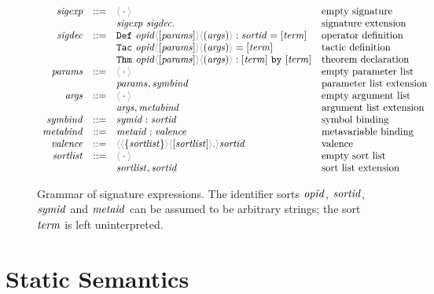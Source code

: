 \begin{figure}[H]
  \begin{displaymath}
    \begin{array}{rcll}
       \SortSigExpr & ::=
         & \ProdEmptySig & \text{empty signature}\\
         && \ProdExtendSig{\SortSigExpr}{\SortSigDecl} & \text{signature extension}\\
       \SortSigDecl & ::=
         & \ProdDefDecl{\SortOpId}{\SortParams}{\SortArgs}{\SortSortId}{\SortTerm} & \text{operator definition}\\
         && \ProdTacDecl{\SortOpId}{\SortParams}{\SortArgs}{\SortTerm} & \text{tactic definition}\\
         && \ProdThmDecl{\SortOpId}{\SortParams}{\SortArgs}{\SortTerm}{\SortTerm} & \text{theorem declaration}\\
       \SortParams & ::=
         & \ProdEmptyCtx & \text{empty parameter list}\\
         && \ProdExtendCtx{\SortParams}{\SortSymBind} & \text{parameter list extension}\\
       \SortArgs & ::=
         & \ProdEmptyCtx & \text{empty argument list}\\
         && \ProdExtendCtx{\SortArgs}{\SortMetaBind}  & \text{argument list extension}\\
       \SortSymBind & ::=
         & \ProdBind{\SortSymId}{\SortSortId} & \text{symbol binding}\\
       \SortMetaBind & ::=
         & \ProdBind{\SortMetaId}{\SortValence} & \text{metavariable binding}\\
       \SortValence & ::=
         & \ProdValence{\SortSortList}{\SortSortList}{\SortSortId} & \text{valence}\\
       \SortSortList & ::=
         & \ProdEmptyCtx & \text{empty sort list}\\
         && \ProdExtendCtx{\SortSortList}{\SortSortId} & \text{sort list extension}
     \end{array}
  \end{displaymath}

  \caption{%
    Grammar of signature expressions. The identifier sorts $\mathit{opid}$,
    $\mathit{sortid}$, $\mathit{symid}$ and $\mathit{metaid}$ can be assumed to be arbitrary
    strings; the sort $\mathit{term}$ is left uninterpreted.%
  }
  \label{fig:sig-grammar}
\end{figure}

\section{Static Semantics}
\label{sec:sig-statics}

